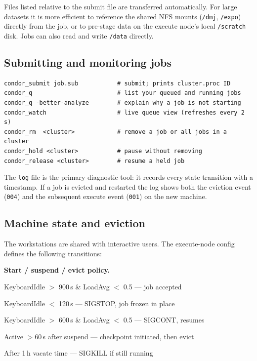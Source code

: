 \documentclass[11pt,a4paper]{article}
\newenvironment{keybox}[1]{%
  \begin{mdframed}[backgroundcolor=boxbg,linecolor=boxframe,linewidth=1pt,
    innertopmargin=6pt,innerbottommargin=6pt,
    innerrightmargin=8pt,innerleftmargin=8pt]
  \textbf{#1.}\quad}{\end{mdframed}}
\begin{document}
Files listed relative to the submit file are transferred automatically.  For
large datasets it is more efficient to reference the shared NFS mounts
(\texttt{/dmj}, \texttt{/expo}) directly from the job, or to pre-stage data
on the execute node's local \texttt{/scratch} disk.  Jobs can also read and
write \texttt{/data} directly.

\subsection{Submitting and monitoring jobs}

\begin{verbatim}
condor_submit job.sub           # submit; prints cluster.proc ID
condor_q                        # list your queued and running jobs
condor_q -better-analyze        # explain why a job is not starting
condor_watch                    # live queue view (refreshes every 2 s)
condor_rm  <cluster>            # remove a job or all jobs in a cluster
condor_hold <cluster>           # pause without removing
condor_release <cluster>        # resume a held job
\end{verbatim}

The \texttt{log} file is the primary diagnostic tool: it records every state
transition with a timestamp.  If a job is evicted and restarted the log shows
both the eviction event (\texttt{004}) and the subsequent execute event
(\texttt{001}) on the new machine.

\subsection{Machine state and eviction}
\label{sec:eviction}

The workstations are shared with interactive users.  The execute-node config
defines the following transitions:

\begin{keybox}{Start / suspend / evict policy}
\small\setlength{\parskip}{2pt}
\begin{description}[leftmargin=2.2cm,style=nextline,font=\normalfont\ttfamily]
  \item[START]    KeyboardIdle $>$ 900\,s \& LoadAvg $<$ 0.5 --- job accepted
  \item[SUSPEND]  KeyboardIdle $<$ 120\,s --- SIGSTOP, job frozen in place
  \item[CONTINUE] KeyboardIdle $>$ 600\,s \& LoadAvg $<$ 0.5 --- SIGCONT, resumes
  \item[PREEMPT]  Active $>$60\,s after suspend --- checkpoint initiated, then evict
  \item[KILL]     After 1\,h vacate time --- SIGKILL if still running
\end{description}
\end{keybox}
\end{document}
